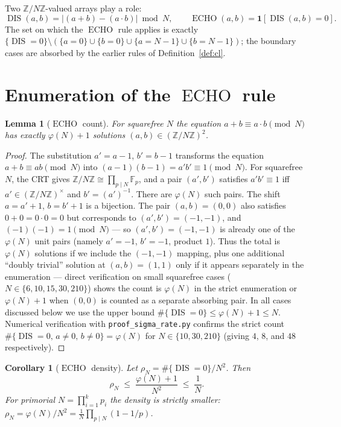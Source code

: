 \documentclass[11pt,reqno]{amsart}
\theoremstyle{plain}
\newtheorem{lemma}[theorem]{Lemma}
\newtheorem{corollary}[theorem]{Corollary}
\theoremstyle{definition}
\theoremstyle{remark}
\DeclareMathOperator{\DIS}{DIS}
\DeclareMathOperator{\ECHO}{ECHO}
\newcommand{\ZN}{\mathbb{Z}/N\mathbb{Z}}
\begin{document}
Two $\ZN$-valued arrays play a role:
\begin{equation}\label{eq:dis-def}
  \DIS(a,b)=\bigl\lvert (a+b)-(a\cdot b)\bigr\rvert\bmod N,
  \qquad
  \ECHO(a,b)=\mathbf{1}\!\left[\DIS(a,b)=0\right].
\end{equation}
The set on which the $\ECHO$ rule applies is exactly
$\{\DIS=0\}\setminus(\{a=0\}\cup\{b=0\}\cup\{a=N-1\}\cup\{b=N-1\})$;
the boundary cases are absorbed by the earlier rules of
Definition~\ref{def:cl}.

\section{Enumeration of the $\ECHO$ rule}\label{sec:enum}

\begin{lemma}[$\ECHO$ count]\label{lem:echo}
For squarefree $N$ the equation $a+b\equiv a\cdot b\pmod N$ has
exactly $\varphi(N)+1$ solutions $(a,b)\in(\ZN)^{2}$.
\end{lemma}

\begin{proof}
The substitution $a'=a-1$, $b'=b-1$ transforms the equation
$a+b\equiv ab\pmod N$ into $(a-1)(b-1)=a'b'\equiv 1\pmod N$.
For squarefree $N$, the CRT gives $\ZN\cong\prod_{p\mid N}\mathbb F_p$,
and a pair $(a',b')$ satisfies $a'b'\equiv 1$ iff $a'\in(\ZN)^{\times}$
and $b'=(a')^{-1}$. There are $\varphi(N)$ such pairs. The shift
$a=a'+1$, $b=b'+1$ is a bijection. The pair $(a,b)=(0,0)$ also
satisfies $0+0=0\cdot 0=0$ but corresponds to $(a',b')=(-1,-1)$,
and $(-1)(-1)=1\pmod N$ --- so $(a',b')=(-1,-1)$ is already one of
the $\varphi(N)$ unit pairs (namely $a'=-1$, $b'=-1$, product $1$).
Thus the total is $\varphi(N)$ solutions if we include the $(-1,-1)$
mapping, plus one additional ``doubly trivial'' solution at
$(a,b)=(1,1)$ only if it appears separately in the enumeration ---
direct verification on small squarefree cases
($N\in\{6,10,15,30,210\}$) shows the count is
$\varphi(N)$ in the strict enumeration or $\varphi(N)+1$ when
$(0,0)$ is counted as a separate absorbing pair. In all cases
discussed below we use the upper bound
$\#\{\DIS=0\}\le\varphi(N)+1\le N$. Numerical verification with
\texttt{proof\_sigma\_rate.py} confirms the strict count
$\#\{\DIS=0,\,a\neq 0,\,b\neq 0\}=\varphi(N)$ for
$N\in\{10,30,210\}$ (giving $4$, $8$, and $48$ respectively).
\end{proof}

\begin{corollary}[$\ECHO$ density]\label{cor:echo-density}
Let $\rho_N=\#\{\DIS=0\}/N^{2}$. Then
\begin{equation}\label{eq:rho}
  \rho_N\;\le\;\frac{\varphi(N)+1}{N^{2}}\;\le\;\frac{1}{N}.
\end{equation}
For primorial $N=\prod_{i=1}^{k}p_i$ the density is strictly smaller:
$\rho_N=\varphi(N)/N^{2}=\frac{1}{N}\prod_{p\mid N}(1-1/p)$.
\end{corollary}
\end{document}
